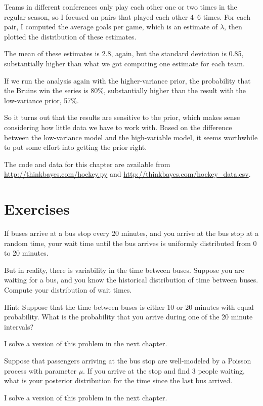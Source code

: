 \documentclass[12pt]{book}
\begin{document}
Teams in different conferences only play each other one or two
times in the regular season, so I focused on pairs that played
each other 4--6 times.  For each pair, I computed the average
goals per game, which is an estimate of $\lambda$, then plotted
the distribution of these estimates.

The mean of these estimates is 2.8, again, but the standard
deviation is 0.85, substantially higher than what we got computing
one estimate for each team.

If we run the analysis again with the higher-variance prior, the
probability that the Bruins win the series is 80\%, substantially
higher than the result with the low-variance prior, 57\%.

So it turns out that the results are sensitive to the prior, which
makes sense considering how little data we have to work with.  Based
on the difference between the low-variance model and the high-variable
model, it seems worthwhile to put some effort into getting the prior
right.

The code and data for this chapter are available from
\url{http://thinkbayes.com/hockey.py} and
\url{http://thinkbayes.com/hockey_data.csv}.


\section{Exercises}

\begin{exercise}

If buses arrive at a bus stop every 20 minutes, and you
arrive at the bus stop at a random time, your wait time until
the bus arrives is uniformly distributed from 0 to 20 minutes.

But in reality, there is variability in the time between
buses.  Suppose you are waiting for a bus, and you know the historical
distribution of time between buses.  Compute your distribution
of wait times.

Hint: Suppose that the time between buses is either
10 or 20 minutes with equal probability.  What is the probability
that you arrive during one of the 20 minute intervals?

I solve a version of this problem in the next chapter.

\end{exercise}


\begin{exercise}

Suppose that passengers arriving at the bus stop are well-modeled
by a Poisson process with parameter $\mu$.  If you arrive at the
stop and find 3 people waiting, what is your posterior distribution
for the time since the last bus arrived.

I solve a version of this problem in the next chapter.

\end{exercise}
\end{document}
